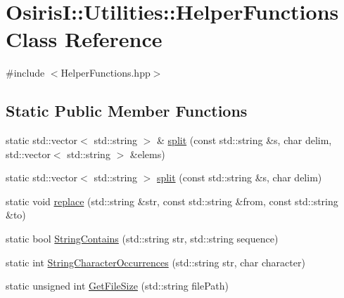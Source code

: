 \hypertarget{class_osiris_i_1_1_utilities_1_1_helper_functions}{\section{Osiris\-I\-:\-:Utilities\-:\-:Helper\-Functions Class Reference}
\label{class_osiris_i_1_1_utilities_1_1_helper_functions}
}


{\ttfamily \#include $<$Helper\-Functions.\-hpp$>$}

\subsection*{Static Public Member Functions}
\begin{DoxyCompactItemize}
\item 
static std\-::vector$<$ std\-::string $>$ \& \hyperlink{class_osiris_i_1_1_utilities_1_1_helper_functions_a3b155e4efe2c2cccdd492be9a36a94b0}{split} (const std\-::string \&s, char delim, std\-::vector$<$ std\-::string $>$ \&elems)
\item 
static std\-::vector$<$ std\-::string $>$ \hyperlink{class_osiris_i_1_1_utilities_1_1_helper_functions_ae442e3b09ac50f9d743e2c52483a71b0}{split} (const std\-::string \&s, char delim)
\item 
static void \hyperlink{class_osiris_i_1_1_utilities_1_1_helper_functions_abe521385ce9979dc04cf01763167cd1a}{replace} (std\-::string \&str, const std\-::string \&from, const std\-::string \&to)
\item 
static bool \hyperlink{class_osiris_i_1_1_utilities_1_1_helper_functions_a05aa24880e0fa68e09612b2b48b34810}{String\-Contains} (std\-::string str, std\-::string sequence)
\item 
static int \hyperlink{class_osiris_i_1_1_utilities_1_1_helper_functions_a39e12738439404f5a311151b9692e509}{String\-Character\-Occurrences} (std\-::string str, char character)
\item 
static unsigned int \hyperlink{class_osiris_i_1_1_utilities_1_1_helper_functions_a230f5483d02254f63e36444724050199}{Get\-File\-Size} (std\-::string file\-Path)
\end{DoxyCompactItemize}


